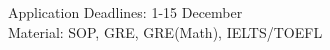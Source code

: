 \noindent Application Deadlines: 1-15 December\\
\noindent Material: SOP, GRE, GRE(Math), IELTS/TOEFL